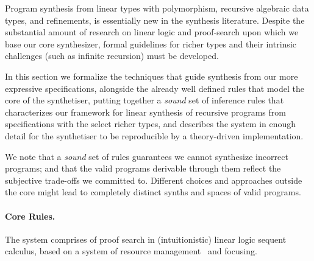\documentclass{llncs}
\newcommand{\mypara}[1]{\paragraph{\textbf{#1}.}}
\begin{document}

Program synthesis from linear types with polymorphism, recursive
algebraic data types, and refinements, is essentially new in the synthesis 
literature. Despite the substantial amount of research on linear logic and
proof-search upon which we base our core synthesizer, formal guidelines for
richer types and their intrinsic challenges (such as infinite
recursion) must be developed.

In this section we formalize  the techniques that guide
synthesis from our more expressive specifications, alongside the already well
defined rules that model the core of the synthetiser, putting together a
\emph{sound} set of inference rules that characterizes our framework
for linear synthesis of
recursive programs from specifications with the select richer types,
and describes the system in enough detail for the synthetiser to be reproducible
by a theory-driven implementation.

We note that a \emph{sound} set of rules guarantees we cannot synthesize
incorrect programs; and that the valid programs derivable through them
reflect the subjective trade-offs we committed to. Different
choices and approaches outside the core might lead to completely
distinct synths and spaces of valid programs.


\mypara{Core Rules} The system comprises of proof search in
(intuitionistic) linear logic sequent calculus, based on a system of
resource management~\cite{resman} and focusing.
\end{document}

